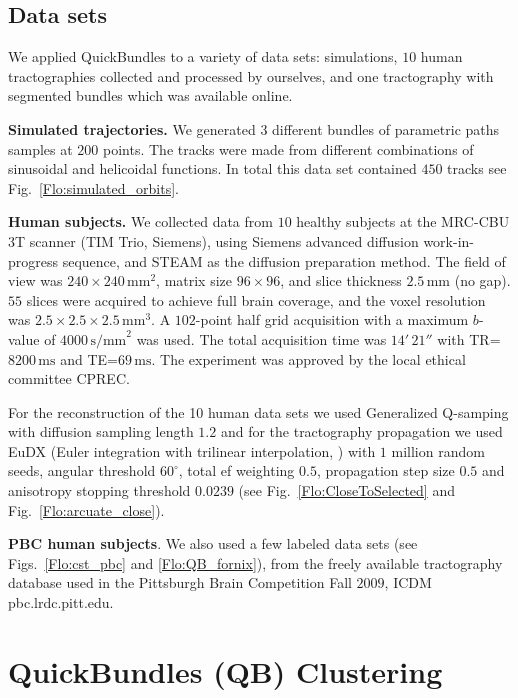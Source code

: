 \documentclass[preprint,authoryear,a4paper,10pt,onecolumn]{elsarticle}
\begin{document}
\subsection{\label{sub:QB-Data-sets}Data sets}

We applied QuickBundles to a variety of data sets: simulations, $10$ human
tractographies collected and processed by ourselves, and one tractography
with segmented bundles which was available online.

\textbf{Simulated trajectories.} We generated $3$ different bundles of
parametric paths samples at $200$ points. The tracks were made from
different combinations of sinusoidal and helicoidal functions.  In total
this data set contained $450$ tracks see Fig.~\ref{Flo:simulated_orbits}.

\textbf{Human subjects.} We collected data from $10$ healthy subjects at
the MRC-CBU 3T scanner (TIM Trio, Siemens), using Siemens advanced
diffusion work-in-progress sequence, and STEAM
\citep{merboldt1992diffusion,MAB04} as the diffusion preparation
method. The field of view was $240\times240\,\textrm{mm}^{2}$, matrix size
$96\times96$, and slice thickness $2.5\,\textrm{mm}$ (no gap).  $55$ slices were
acquired to achieve full brain coverage, and the voxel resolution was
$2.5\times2.5\times2.5\,\textrm{mm}^{3}$. A $102$-point half grid
acquisition \citep{Yeh2010} with a maximum $b$-value of $4000\, \textrm{s/mm}^{2}$
was used. The total acquisition time was $14'\,21''$ with
TR=$8200\,\textrm{ms}$ and TE=$69\,\textrm{ms}$. The experiment was approved
by the local ethical committee CPREC.

For the reconstruction of the 10 human data sets we used Generalized
Q-samping \citep{Garyfallidis_thesis} with diffusion sampling length
$1.2$ and for the tractography propagation we used EuDX (Euler
integration with trilinear interpolation, \citet{Garyfallidis_thesis})
with $1$ million random seeds, angular threshold $60^{\circ}$, total
ef weighting $0.5$, propagation step size $0.5$ and anisotropy stopping
threshold $0.0239$ (see Fig.~\ref{Flo:CloseToSelected} 
and Fig.~\ref{Flo:arcuate_close}).

\textbf{PBC human subjects}. We also used a few labeled data sets (see
Figs.~\ref{Flo:cst_pbc} and \ref{Flo:QB_fornix}), from the freely available
tractography database used in the Pittsburgh Brain Competition Fall
$2009$, ICDM pbc.lrdc.pitt.edu.

\section{QuickBundles (QB) Clustering}
\end{document}
